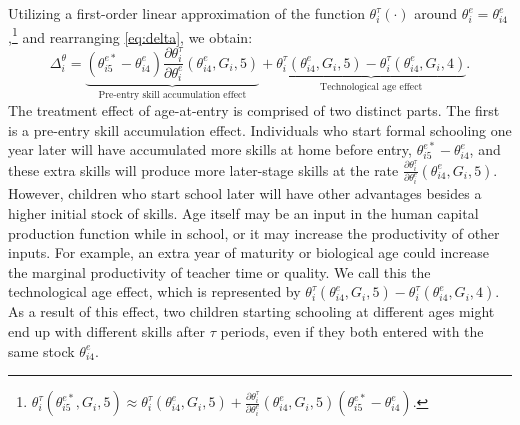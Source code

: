 \documentclass[12pt,a4paper]{article}
\begin{document}
\begin{bibunit}
Utilizing a first-order linear approximation of the function $\theta_{i}^\tau(\cdot)$ around $\theta_{i}^{e}=\theta_{i4}^{e}$,\footnote{\hspace{0.05cm}
$\theta_{i}^\tau(\theta_{i5}^{e*}, G_i,5) \approx
\theta_{i}^\tau(\theta_{i4}^{e}, G_i,5)+\frac{\partial \theta_{i}^\tau}{\partial \theta_{i}^{e}}(\theta_{i4}^{e},G_{i},5)\left(\theta_{i5}^{e*}-\theta_{i4}^{e}\right).$}
and rearranging \autoref{eq:delta}, we obtain:
\begin{equation}
\Delta_{i}^{\theta}= \underbrace{\left(\theta_{i5}^{e*}-\theta_{i4}^e\right)\frac{\partial \theta_{i}^\tau}{\partial \theta_{i}^{e}}(\theta_{i4}^{e},G_{i},5)}_{\text{Pre-entry skill accumulation effect}}+\underbrace{\theta_{i}^\tau(\theta_{i4}^{e}, G_{i},5)-\theta_{i}^\tau(\theta_{i4}^{e}, G_{i},4)}_{\text{Technological age effect}}. \label{eqn:TreatmentEffect}
\end{equation}
\indent The treatment effect of age-at-entry is comprised of two distinct parts.  The first is a pre-entry skill accumulation effect.  Individuals who start formal schooling one year later will have accumulated more skills at home before entry,  $\theta_{i5}^{e*} - \theta_{i4}^{e}$, and these extra skills will produce more later-stage skills at the rate $\frac{\partial \theta_{i}^\tau}{\partial \theta_{i}^{e}}(\theta_{i4}^{e},G_{i},5)$. However, children who start school later will have other advantages besides a higher initial stock of skills.  Age itself may be an input in the human capital production function while in school, or it may increase the productivity of other inputs.  For example, an extra year of maturity or biological age could increase the marginal productivity of teacher time or quality.   We call this the technological age effect, which is represented by $\theta_{i}^\tau(\theta_{i4}^{e}, G_{i},5)-\theta_{i}^\tau\left(\theta_{i4}^{e}, G_{i},4\right)$. As a result of this effect, two children starting schooling at different ages might end up with different skills after $\tau$ periods, even if they both entered with the same stock $\theta_{i4}^{e}$.


\end{bibunit}
\end{document}
